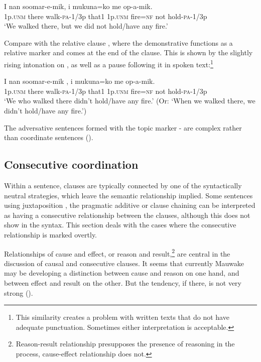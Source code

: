 \ea%
\label{ex:8:x1394}
\gll I  nan  soomar-e-mik,    i  mukuna=ko  me op-a-mik.\\
1p.\textsc{unm}  there  walk-\textsc{pa}-1/3p  that1  1p.\textsc{unm}  fire=\textsc{nf} not hold-\textsc{pa}-1/3p     \\
\glt`We walked there, but we did not hold/have any fire.'
\z


Compare  with the relative clause , where the demonstrative functions as a relative marker and comes at the end of the clause. This is shown by the slightly rising intonation on , as well as a pause following it in spoken text:\footnote{This similarity creates a problem with written texts that do not have adequate punctuation. Sometimes either interpretation is acceptable.} 

\ea%
\label{ex:8:x1396}
\gll I  nan  soomar-e-mik ,  i  mukuna=ko  me op-a-mik.\\
1p.\textsc{unm}  there  walk-\textsc{pa}-1/3p that1  1p.\textsc{unm}  fire=\textsc{nf}  not hold-\textsc{pa}-1/3p\\
\glt`We who walked there didn't hold/have any fire.' (Or: `When we walked there, we didn't hold/have any fire.')
\z

The adversative sentences formed with the topic marker - are complex rather than coordinate sentences ().

\subsection{Consecutive coordination}

Within a sentence, clauses are typically connected by one of the syntactically neutral strategies, which leave the semantic relationship implied. Some sentences using juxtaposition , the pragmatic additive   or clause chaining  can be interpreted as having a consecutive relationship between the clauses, although this does not show in the syntax. This section deals with the cases where the consecutive relationship is marked overtly.

Relationships of cause and effect, or reason and result,\footnote{Reason-result relationship presupposes the presence of reasoning in the process, cause-effect relationship does not.}  are central in the discussion of causal and consecutive clauses. It seems that currently Mauwake may be developing a distinction between cause and reason on one hand, and between effect and result on the other. But the tendency, if there, is not very strong (). 

